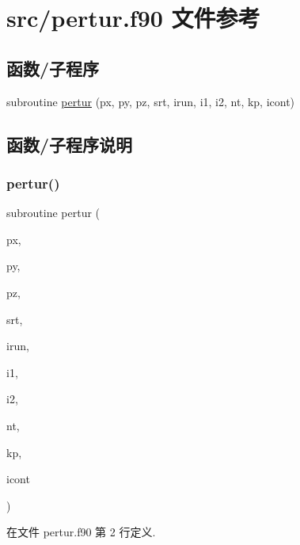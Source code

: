 \hypertarget{pertur_8f90}{}\section{src/pertur.f90 文件参考}
\label{pertur_8f90}
\subsection*{函数/子程序}
\begin{DoxyCompactItemize}
\item 
subroutine \mbox{\hyperlink{pertur_8f90_a7e7a44ee0a6a8de242b3b060ea6dd001}{pertur}} (px, py, pz, srt, irun, i1, i2, nt, kp, icont)
\end{DoxyCompactItemize}


\subsection{函数/子程序说明}
\mbox{\label{pertur_8f90_a7e7a44ee0a6a8de242b3b060ea6dd001}} 
\subsubsection{\texorpdfstring{pertur()}{pertur()}}
{\footnotesize\ttfamily subroutine pertur (\begin{DoxyParamCaption}\item[{}]{px,  }\item[{}]{py,  }\item[{}]{pz,  }\item[{}]{srt,  }\item[{}]{irun,  }\item[{}]{i1,  }\item[{}]{i2,  }\item[{}]{nt,  }\item[{}]{kp,  }\item[{}]{icont }\end{DoxyParamCaption})}



在文件 pertur.\+f90 第 2 行定义.

